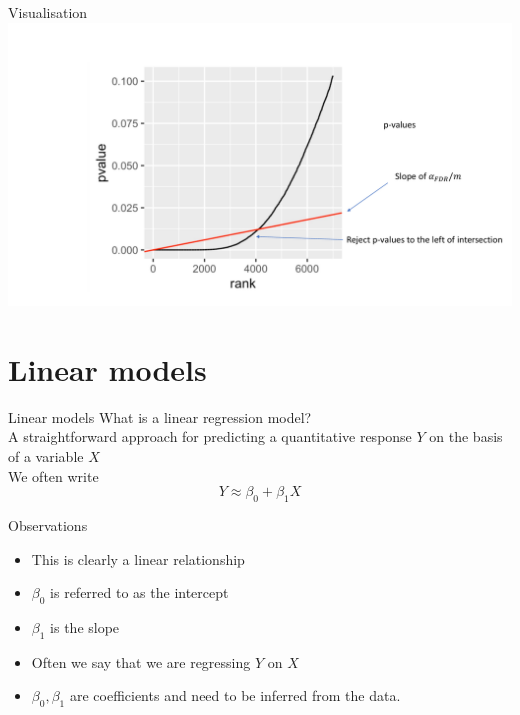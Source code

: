 \documentclass{bredelebeamer}
\begin{document}
\begin{frame}{Visualisation}
\includegraphics[width=1\textwidth]{fdrvis}
\end{frame}



\section{Linear models}
\begin{frame}{Linear models}
What is a linear regression model?
\\
A straightforward approach for predicting a quantitative response $Y$ on the basis of a variable $X$
\\
We often write
\begin{equation}
Y \approx \beta_0 + \beta_1 X
\end{equation}
\begin{block}{Observations}
\begin{itemize}
\item This is clearly a linear relationship
\item $\beta_0$ is referred to as the intercept
\item $\beta_1$ is the slope
\item Often we say that we are regressing $Y$ on $X$
\item $\beta_0, \beta_1$ are coefficients and need to be inferred from the data.
\end{itemize}
\end{block}
\end{frame}
\end{document}
